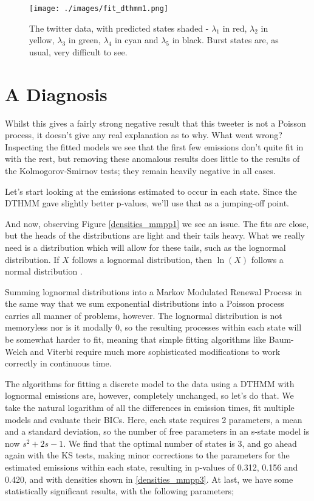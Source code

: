 \begin{figure}[h!]
\centering
\texttt{[image: ./images/fit\_dthmm1.png]}
\caption{The twitter data, with predicted states shaded - $\lambda_1$ in red, $\lambda_2$ in yellow, $\lambda_3$ in green, $\lambda_4$ in cyan and $\lambda_5$ in black. Burst states are, as usual, very difficult to see.}
\label{fit_dthmm1}
\end{figure}

\section{A Diagnosis}

Whilst this gives a fairly strong negative result that this tweeter is not a Poisson process, it doesn't give any real explanation as to why. What went wrong? Inspecting the fitted models we see that the first few emissions don't quite fit in with the rest, but removing these anomalous results does little to the results of the Kolmogorov-Smirnov tests; they remain heavily negative in all cases.

Let's start looking at the emissions estimated to occur in each state. Since the DTHMM gave slightly better p-values, we'll use that as a jumping-off point.

And now, observing Figure \ref{densities_mmpp1} we see an issue. The fits are close, but the heads of the distributions are light and their tails heavy. What we really need is a distribution which will allow for these tails, such as the lognormal distribution. If $X$ follows a lognormal distribution, then $\ln(X)$ follows a normal distribution \cite{mwlognormal}.

Summing lognormal distributions into a Markov Modulated Renewal Process in the same way that we sum exponential distributions into a Poisson process carries all manner of problems, however. The lognormal distribution is not memoryless nor is it modally 0, so the resulting processes within each state will be somewhat harder to fit, meaning that simple fitting algorithms like Baum-Welch and Viterbi require much more sophisticated modifications to work correctly in continuous time.

The algorithms for fitting a discrete model to the data using a DTHMM with lognormal emissions are, however, completely unchanged, so let's do that. We take the natural logarithm of all the differences in emission times, fit multiple models and evaluate their BICs. Here, each state requires 2 parameters, a mean and a standard deviation, so the number of free parameters in an s-state model is now $s^2+2s-1$. We find that the optimal number of states is 3, and go ahead again with the KS tests, making minor corrections to the parameters for the estimated emissions within each state, resulting in p-values of 0.312, 0.156 and 0.420, and with densities shown in \ref{densities_mmpp3}. At last, we have some statistically significant results, with the following parameters;

